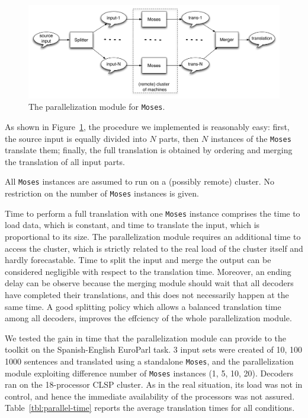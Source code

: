 \documentclass[10pt]{report}
\theoremstyle{plain}
\begin{document}
{\begin{figure}
\begin{center}
\label{fig:parallel}
\caption{The parallelization module for {\tt Moses}.}
 \includegraphics[width=\columnwidth]{Moses-parallel}
\end{center}
 \end{figure}
 
As shown in Figure~\ref{fig:parallel}, the procedure we implemented is reasonably easy:
first, the source input is equally divided into $N$ parts, then $N$ instances of the {\tt Moses} translate them; finally, the full translation is obtained by ordering and merging the translation of all input parts.

All {\tt Moses} instances are assumed to run on a (possibly remote) cluster. No restriction on the number of {\tt Moses} instances is given.


Time to perform a full translation with one {\tt Moses} instance comprises the time to load data, which is constant, and time to translate the input, which is proportional to its size.
The parallelization module requires an additional time to access the cluster, which is strictly related to the real load of the cluster itself and hardly forecastable.
Time to split the input and merge the output can be considered negligible with respect to the translation time.
Moreover, an ending delay can be observe because the merging module should wait that all decoders have completed their translations, and this does not necessarily happen at the same time. A good splitting policy which allows a balanced translation time among all decoders,  improves the effciency of the whole parallelization module.

We tested the gain in time that  the parallelization module can provide to the toolkit on the Spanish-English EuroParl task. 3 input sets were created of 10, 100 1000 sentences and translated using a standalone  {\tt Moses}, and the parallelization module exploiting difference number of {\tt Moses} instances (1, 5, 10, 20).
Decoders ran on the 18-processor CLSP cluster. As in the real situation, its load was not in control, and hence the immediate availability of the processors was not assured. Table~\ref{tbl:parallel-time} reports the average translation times for all conditions.

}
\end{document}
